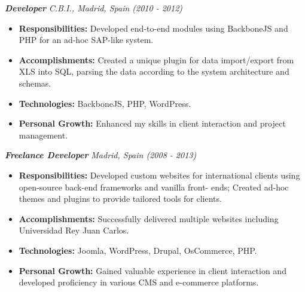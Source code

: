\documentclass[a4paper,10pt]{article}
\begin{document}
\begin{samepage}
{\vspace{0.5cm}

\textbf{\textit{Developer}}
\textit{\small C.B.I., Madrid, Spain (2010 - 2012)}
\vspace{0.3cm}
\begin{itemize}[leftmargin=*]
    \item \textbf{Responsibilities:} Developed end-to-end modules using BackboneJS and PHP for an ad-hoc SAP-like system.
    \item \textbf{Accomplishments:} Created a unique plugin for data import/export from XLS into SQL, parsing the data according to the system
    architecture and schemas.
    \item \textbf{Technologies:} BackboneJS, PHP, WordPress.
    \item \textbf{Personal Growth:} Enhanced my skills in client interaction and project management.
\end{itemize}

\vspace{0.5cm}

\textbf{\textit{Freelance Developer}}
\textit{\small Madrid, Spain (2008 - 2013)}
\vspace{0.3cm}
\begin{itemize}[leftmargin=*]
    \item \textbf{Responsibilities:} Developed custom websites for international clients using open-source back-end frameworks and vanilla front-
    ends; Created ad-hoc themes and plugins to provide tailored tools for clients.
    \item \textbf{Accomplishments:} Successfully delivered multiple websites including Universidad Rey Juan Carlos.
    \item \textbf{Technologies:} Joomla, WordPress, Drupal, OsCommerce, PHP.
    \item \textbf{Personal Growth:} Gained valuable experience in client interaction and developed proficiency in various CMS and e-commerce
    platforms.
\end{itemize}

\vspace{0.5cm}
}

\end{samepage}  %
\end{document}
